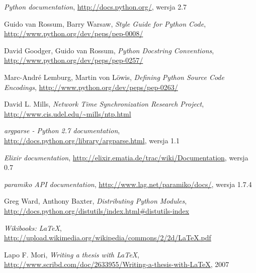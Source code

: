 \documentclass[00-praca-magisterska.tex]{subfiles}
\begin{document}
\begin{thebibliography}{9}
  \emph{Python documentation}, 
  \url{http://docs.python.org/},
  wersja 2.7

  Guido van Rossum, Barry Warsaw,
  \emph{Style Guide for Python Code},
  \url{http://www.python.org/dev/peps/pep-0008/}

  David Goodger, Guido van Rossum,
  \emph{Python Docstring Conventions},
  \url{http://www.python.org/dev/peps/pep-0257/}

  Marc-André Lemburg, Martin von Löwis,
  \emph{Defining Python Source Code Encodings},
  \url{http://www.python.org/dev/peps/pep-0263/}

  David L. Mills,
  \emph{Network Time Synchronization Research Project},
  \url{http://www.cis.udel.edu/~mills/ntp.html}

  \emph{argparse - Python 2.7 documentation},
  \url{http://docs.python.org/library/argparse.html},
  wersja 1.1

  \emph{Elixir documentation},
  \url{http://elixir.ematia.de/trac/wiki/Documentation},
  wersja 0.7


  \emph{paramiko API documentation},
  \url{http://www.lag.net/paramiko/docs/},
  wersja 1.7.4

  Greg Ward, Anthony Baxter,
  \emph{Distributing Python Modules},
  \url{http://docs.python.org/distutils/index.html#distutils-index}

  \emph{Wikibooks: \LaTeX},
  \url{http://upload.wikimedia.org/wikipedia/commons/2/2d/LaTeX.pdf}

  Lapo F. Mori, 
  \emph{Writing a thesis with \LaTeX},
  \url{http://www.scribd.com/doc/2633955/Writing-a-thesis-with-LaTeX},
  2007

\end{thebibliography}

%
%
%
%
%
%
\end{document}
